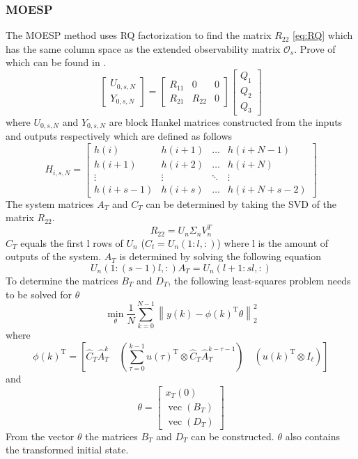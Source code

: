 \subsubsection{MOESP}
The MOESP method uses RQ factorization to find the matrix $R_{22}$ \ref{eq:RQ} which has the same column space as the extended observability matrix $\mathcal{O}_s$. Prove of which can be found in \cite[p.~304--305]{FilteringIdentification}.
\begin{equation}
    \left[\begin{array}{c}
        U_{0, s, N} \\
        Y_{0, s, N}
    \end{array}\right]=\left[\begin{array}{ccc}
        R_{11} & 0 & 0 \\
        R_{21} & R_{22} & 0
    \end{array}\right]\left[\begin{array}{c}
        Q_{1} \\
        Q_{2} \\
        Q_{3}
    \end{array}\right]
    \label{eq:RQ}
\end{equation}
where $U_{0,s,N}$ and $Y_{0,s,N}$ are block Hankel matrices constructed from the inputs and outputs respectively which are defined as follows
$$
H_{i, s, N}=\left[\begin{array}{cccc}
h(i) & h(i+1) & \dots & h(i+N-1) \\
h(i+1) & h(i+2) & \dots & h(i+N) \\
\vdots & \vdots & \ddots & \vdots \\
h(i+s-1) & h(i+s) & \dots & h(i+N+s-2)
\end{array}\right]
$$
The system matrices $A_T$ and $C_T$ can be determined by taking the SVD of the matrix $R_{22}$.
$$
R_{22} = U_n\Sigma_nV_n^T
$$
$C_T$ equals the first l rows of $U_n$ ($C_t = U_n(1:l,:)$) where l is the amount of outputs of the system.
$A_T$ is determined by solving the following equation
$$
U_n(1:(s-1)l,:)A_T = U_n(l+1:sl,:)
$$
To determine the matrices $B_T$ and $D_T$, the following least-squares problem needs to be solved for $\theta$
$$
    \min _{\theta} \frac{1}{N} \sum_{k=0}^{N-1}\left\|y(k)-\phi(k)^{\mathrm{T}} \theta\right\|_{2}^{2}
$$
where
$$
    \phi(k)^{\mathrm{T}}=\left[\widehat{C}_{T} \widehat{A}_{T}^{k} \quad\left(\sum_{\tau=0}^{k-1} u(\tau)^{\mathrm{T}} \otimes \widehat{C}_{T} \widehat{A}_{T}^{k-\tau-1}\right) \quad\left(u(k)^{\mathrm{T}} \otimes I_{\ell}\right)\right]
$$
and
$$
    \theta=\left[\begin{array}{c}
    x_{T}(0) \\
    \operatorname{vec}\left(B_{T}\right) \\
    \operatorname{vec}\left(D_{T}\right)
    \end{array}\right]
$$
From the vector $\theta$ the matrices $B_T$ and $D_T$ can be constructed. $\theta$ also contains the transformed initial state.




